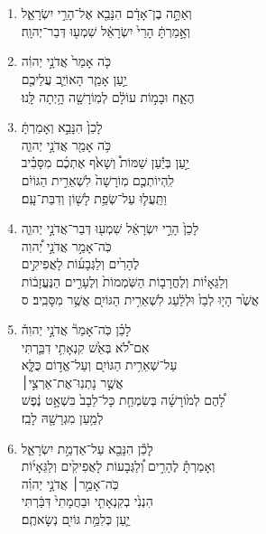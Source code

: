 \documentclass[12pt,a4paper,titlepage]{article}
\def \pslabelsep{-0.9em} %
\def \psleftmargin{0em} %
\begin{document}
\section*{}
\begin{enumerate}[leftmargin=\psleftmargin, labelsep = \pslabelsep, label={\arabic*}, font=\color{\pscolor}\small\textsuperscript, parsep=0em, itemsep=0em, topsep=0em ]
\item \texthebrew{וְאַתָּ֣ה בֶן־אָדָ֔ם הִנָּבֵ֖א אֶל־הָרֵ֣י יִשְׂרָאֵ֑ל \\ וְאָ֣מַרְתָּ֔ הָרֵי֙ יִשְׂרָאֵ֔ל שִׁמְע֖וּ דְּבַר־יְהוָֽה׃}
\item \texthebrew{כֹּ֤ה אָמַר֙ אֲדֹנָ֣י יְהוִ֔ה \\ יַ֣עַן אָמַ֧ר הָאוֹיֵ֛ב עֲלֵיכֶ֖ם \\ הֶאָ֑ח וּבָמ֣וֹת עוֹלָ֔ם לְמֽוֹרָשָׁ֖ה הָ֥יְתָה לָּֽנוּ׃}
\item \texthebrew{לָכֵן֙ הִנָּבֵ֣א וְאָמַרְתָּ֔ \\ כֹּ֥ה אָמַ֖ר אֲדֹנָ֣י יְהוִ֑ה \\ יַ֣עַן בְּיַ֡עַן שַׁמּוֹת֩ וְשָׁאֹ֙ף אֶתְכֶ֜ם מִסָּבִ֗יב \\ לִֽהְיוֹתְכֶ֤ם מֽוֹרָשָׁה֙ לִשְׁאֵרִ֣ית הַגּוֹיִ֔ם \\ וַתֵּֽעֲל֛וּ עַל־שְׂפַ֥ת לָשׁ֖וֹן וְדִבַּת־עָֽם׃}
\item \texthebrew{לָכֵן֙ הָרֵ֣י יִשְׂרָאֵ֔ל שִׁמְע֖וּ דְּבַר־אֲדֹנָ֣י יְהוִ֑ה \\ כֹּֽה־אָמַ֣ר אֲדֹנָ֣י יְ֠הוִה \\ לֶהָרִ֙ים וְלַגְּבָע֜וֹת לָאֲפִיקִ֣ים \\ וְלַגֵּאָי֗וֹת וְלֶחֳרָב֤וֹת הַשֹּֽׁמְמוֹת֙ וְלֶעָרִ֣ים הַנֶּעֱזָב֔וֹת\\  אֲשֶׁ֙ר הָי֤וּ לְבַז֙ וּלְלַ֔עַג לִשְׁאֵרִ֥ית הַגּוֹיִ֖ם אֲשֶׁ֥ר מִסָּבִֽיב׃ ס}
\item \texthebrew{לָכֵ֗ן כֹּֽה־אָמַר֘ אֲדֹנָ֣י יְהוִה֒ \\ אִם־לֹ֠א בְּאֵ֙שׁ קִנְאָתִ֥י דִבַּ֛רְתִּי \\ עַל־שְׁאֵרִ֥ית הַגּוֹיִ֖ם וְעַל־אֱד֣וֹם כֻּלָּ֑א \\ אֲשֶׁ֣ר נָתְנֽוּ־אֶת־אַרְצִ֣י׀ \\ לָ֠הֶם לְמ֙וֹרָשָׁ֜ה בְּשִׂמְחַ֤ת כָּל־לֵבָב֙ בִּשְׁאָ֣ט נֶ֔פֶשׁ \\ לְמַ֥עַן מִגְרָשָׁ֖הּ לָבַֽז׃}
\item \texthebrew{לָכֵ֕ן הִנָּבֵ֖א עַל־אַדְמַ֣ת יִשְׂרָאֵ֑ל \\ וְאָמַרְתָּ֡ לֶהָרִ֣ים וְ֠לַגְּבָעוֹת לָאֲפִיקִ֙ים וְלַגֵּאָי֜וֹת \\ כֹּֽה־אָמַ֣ר׀ אֲדֹנָ֣י יְהוִ֗ה \\ הִנְנִ֙י בְקִנְאָתִ֤י וּבַחֲמָתִי֙ דִּבַּ֔רְתִּי \\ יַ֛עַן כְּלִמַּ֥ת גּוֹיִ֖ם נְשָׂאתֶֽם׃}

\end{enumerate}
\end{document}

